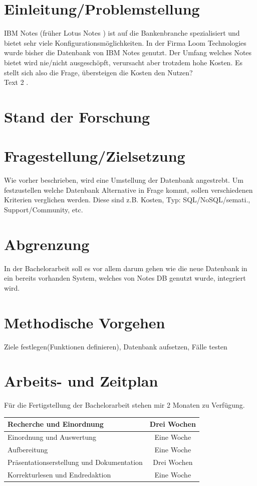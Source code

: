 \documentclass{article}
\begin{document}
\section{Einleitung/Problemstellung}
IBM Notes (früher Lotus Notes \cite{LotusNotes}) ist auf die Bankenbranche spezialisiert und bietet sehr viele Konfigurationsmöglichkeiten. In der Firma Loom Technologies wurde bisher die Datenbank von IBM Notes genutzt. Der Umfang welches Notes bietet wird nie/nicht ausgeschöpft, verursacht aber trotzdem hohe Kosten. Es stellt sich also die Frage, übersteigen die Kosten den Nutzen?\\
Text 2 \cite{IBMNotesWiki}.
\section{Stand der Forschung}

\section{Fragestellung/Zielsetzung}
Wie vorher beschrieben, wird eine Umstellung der Datenbank angestrebt. Um festzustellen welche Datenbank Alternative in Frage kommt, sollen verschiedenen Kriterien verglichen werden. Diese sind z.B. Kosten, Typ: SQL/NoSQL/semati., Support/Community, etc. 
\section{Abgrenzung}
In der Bachelorarbeit soll es vor allem darum gehen wie die neue Datenbank in ein bereits vorhanden System, welches von Notes DB genutzt wurde, integriert wird.
\section{Methodische Vorgehen}
Ziele festlegen(Funktionen definieren),  Datenbank aufsetzen, Fälle testen 
\section{Arbeits- und Zeitplan}
Für die Fertigstellung der Bachelorarbeit stehen mir 2 Monaten zu Verfügung.
\begin{flushleft}
\begin{center}
\begin{tabular}{|l|c|}
\hline
Recherche und Einordnung & Drei Wochen\\
\hline
Einordnung und Auswertung & Eine Woche\\
\hline
Aufbereitung & Eine Woche\\
\hline
Präsentationserstellung und Dokumentation & Drei Wochen\\
\hline
Korrekturlesen und Endredaktion & Eine Woche \\
\hline
\end{tabular}
\end{center}
\end{flushleft}

 
\end{document}
